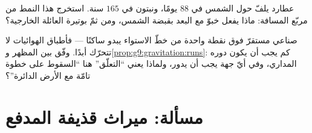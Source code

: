 \begin{exercise}[$\star\star$]\label{exo:g9:gravitation:11}
عطارد يلفّ حول الشمس في $88$ يومًا، ونبتون في $165$ سنة.
استخرج هذا النمط من مربّع المسافة: ماذا يفعل خبوّ  مع
البعد بقبضة الشمس، ومن ثمّ بوتيرة العائلة الخارجية؟
\end{exercise}

\begin{exercise}[$\star\star\star$]\label{exo:g9:gravitation:12}
 صناعي مستقرّ فوق نقطة واحدة من خطّ الاستواء يبدو ساكنًا
--- فأطباق الهوائيات لا تتحرّك أبدًا. وفّق بين المظهر
و\cref{prop:g9:gravitation:runs}: كم يجب أن يكون دوره
المداري، وفي أيّ جهة يجب أن يدور، ولماذا يعني ``التعلّق'' هنا
``السقوط على خطوة تامّة مع الأرض الدائرة''؟
\end{exercise}

\section{مسألة: ميراث قذيفة المدفع}

